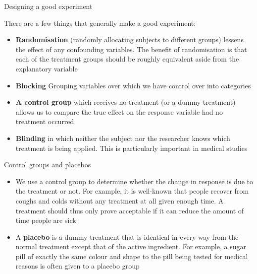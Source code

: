 \documentclass[12pt,xcolor=dvipsnames,handout,mathserif,aspectratio=169]{beamer}
\newcommand{\bbl}[1]{{\color{NavyBlue} \textbf{#1}}}
\newcommand{\bre}[1]{{\color{red} \textbf{#1}}}
\begin{document}
\begin{frame}{Designing a good experiment }

There are a few things that generally make a good experiment:
\begin{itemize}
\item \bbl{Randomisation} (randomly allocating subjects to different groups) lessens the effect of any confounding variables. The benefit of randomisation is that each of the treatment groups should be roughly equivalent aside from the explanatory variable
\item \bbl{Blocking} Grouping variables over which we have control over into categories
\item \bbl{A control group} which receives no treatment (or a dummy treatment) allows us to compare the true effect on the response variable had no treatment occurred
\item \bbl{Blinding} in which neither the subject nor the researcher knows which treatment is being applied. This is particularly important in medical studies
\end{itemize}

\end{frame}

\begin{frame}{Control groups and placebos }

\begin{itemize}
\item We use a control group to determine whether the change in response is due to the treatment or not. For example, it is well-known that people recover from coughs and colds without any treatment at all given enough time. A treatment should thus only prove acceptable if it can reduce the amount of time people are sick
\pause
\item A \bre{placebo} is a dummy treatment that is identical in every way from the normal treatment except that of the active ingredient. For example, a sugar pill of exactly the same colour and shape to the pill being tested for medical reasons is often given to a placebo group 
\end{itemize}

\end{frame}
\end{document}
